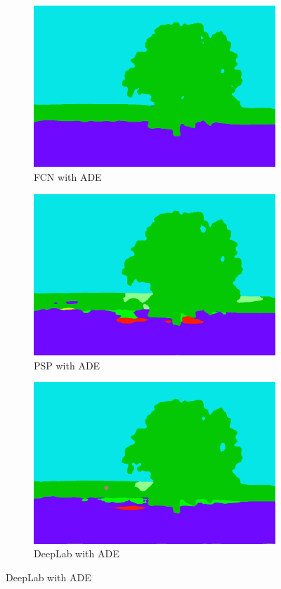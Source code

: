 \documentclass[12pt,a4paper,table,dvipsnames,tikz]{report}
\newcommand{\acronym}{\MakeUppercase}
\begin{document}
\begin{figure}[h!]
\begin{subfigure}[b]{0.3\textwidth}
			\includegraphics[width=\textwidth]{out_ade_fcn}
			\caption{\acronym{fcn} with \acronym{ade}}
		\end{subfigure}
		\begin{subfigure}[b]{0.3\textwidth}
			\includegraphics[width=\textwidth]{out_ade_psp}
			\caption{\acronym{psp} with \acronym{ade}}
		\end{subfigure}
		\begin{subfigure}[b]{0.3\textwidth}
			\includegraphics[width=\textwidth]{out_ade_deep}
			\caption{DeepLab with \acronym{ade}}
		\end{subfigure}
		\label{fig:out}
	\end{figure}
	
\end{document}
